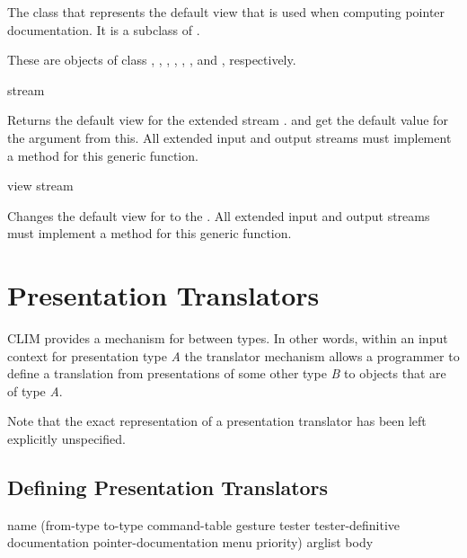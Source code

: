 
The class that represents the default view that is used when computing pointer
documentation.  It is a subclass of .


These are objects of class , ,
, , ,
, and , respectively.

 {stream}

Returns the default view for the extended stream .   and
 get the default value for the  argument from this.  All
extended input and output streams must implement a method for this generic
function.

 {view stream}

Changes the default view for  to the  .  All
extended input and output streams must implement a method for this generic
function.


\section {Presentation Translators}

CLIM provides a mechanism for  between types.  In other
words, within an input context for presentation type {\it A} the translator
mechanism allows a programmer to define a translation from presentations of some
other type {\it B} to objects that are of type {\it A}.

Note that the exact representation of a presentation translator has been left
explicitly unspecified.


\subsection {Defining Presentation Translators}

 {name 
                                            (from-type to-type command-table
                                             \key gesture
                                                  tester tester-definitive
                                                  documentation pointer-documentation 
                                                  menu priority)
                                            arglist
                                            \body body}

